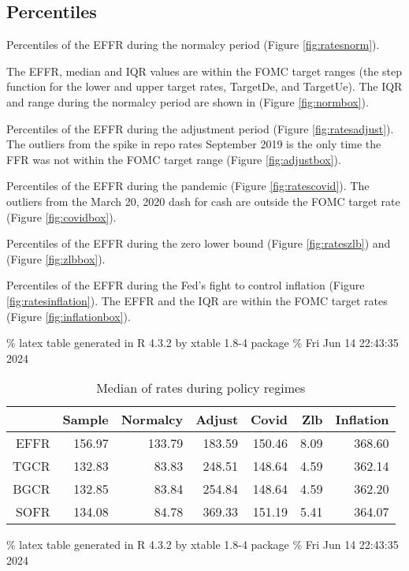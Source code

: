\documentclass[
]{article}
\begin{document}
\hypertarget{percentiles}{%
\subsection{Percentiles}\label{percentiles}}

Percentiles of the EFFR during the normalcy period (Figure \ref{fig:ratesnorm}).

The EFFR, median and IQR values are within the FOMC target ranges (the step function for the lower and upper target rates, TargetDe, and TargetUe).
The IQR and range during the normalcy period are shown in (Figure \ref{fig:normbox}).

Percentiles of the EFFR during the adjustment period (Figure \ref{fig:ratesadjust}).
The outliers from the spike in repo rates September 2019 is the only time the FFR was not within the FOMC target range (Figure \ref{fig:adjustbox}).

Percentiles of the EFFR during the pandemic (Figure \ref{fig:ratescovid}).
The outliers from the March 20, 2020 dash for cash are outside the FOMC target rate
(Figure \ref{fig:covidbox}).

Percentiles of the EFFR during the zero lower bound (Figure \ref{fig:rateszlb})
and (Figure \ref{fig:zlbbox}).

Percentiles of the EFFR during the Fed's fight to control inflation (Figure \ref{fig:ratesinflation}).
The EFFR and the IQR are within the FOMC target rates (Figure \ref{fig:inflationbox}).

\% latex table generated in R 4.3.2 by xtable 1.8-4 package
\% Fri Jun 14 22:43:35 2024

\begin{table}[ht]
\centering
\begin{tabular}{rrrrrrr}
  \hline
 & Sample & Normalcy & Adjust & Covid & Zlb & Inflation \\ 
  \hline
EFFR & 156.97 & 133.79 & 183.59 & 150.46 & 8.09 & 368.60 \\ 
  TGCR & 132.83 & 83.83 & 248.51 & 148.64 & 4.59 & 362.14 \\ 
  BGCR & 132.85 & 83.84 & 254.84 & 148.64 & 4.59 & 362.20 \\ 
  SOFR & 134.08 & 84.78 & 369.33 & 151.19 & 5.41 & 364.07 \\ 
   \hline
\end{tabular}
\caption{Median of rates during policy regimes} 
\end{table}

\% latex table generated in R 4.3.2 by xtable 1.8-4 package
\% Fri Jun 14 22:43:35 2024
\end{document}
